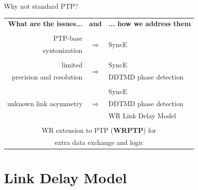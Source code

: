 \documentclass[compress,red]{beamer}
\begin{document}
\begin{frame}{Why not standard PTP?}

  \resizebox{11cm}{!} 
  {
    \begin{tabular}{ r c l }
  {\bf What are the issues...} 	& {\bf and}      & {\bf ... how we address them}  \\
				&     		 &        \\
      PTP-base		 	& \multirow{2}{*}{$\Rightarrow$}  & \multirow{2}{*}{SyncE }\\
      syntonization	        &      		 &        \\
				&      		 &        			\\
      limited             	&\multirow{2}{*}{$\Rightarrow$}  	 & SyncE \\
      precision and resolution  &      		 & DDTMD phase detection\\
				&    		 &        \\
			        &      		 & SyncE  \\
      unknown link asymmetry    & $\Rightarrow$  & DDTMD phase detection \\
				&      		 & WR Link Delay Model \\
				&      		 &        \\
      \multicolumn{3}{c}{WR extension to PTP ({\bf WRPTP}) for } \\
      \multicolumn{3}{c}{extra data exchange and logic} \\
    \end{tabular}
  }
\end{frame}

\section{Link Delay Model}
\end{document}
